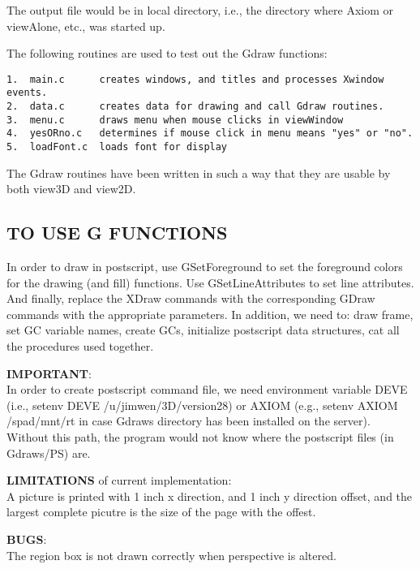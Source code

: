 \documentclass{article}
\begin{document}
The output file would be in local directory, i.e., the directory where Axiom
or viewAlone, etc., was started up.

The following routines are used to test out the Gdraw functions:
\begin{verbatim}
1.  main.c      creates windows, and titles and processes Xwindow events.
2.  data.c      creates data for drawing and call Gdraw routines.
3.  menu.c      draws menu when mouse clicks in viewWindow
4.  yesORno.c   determines if mouse click in menu means "yes" or "no".
5.  loadFont.c 	loads font for display
\end{verbatim}

The Gdraw routines have been written in such a way that they are usable by
both view3D and view2D.

\subsection{TO USE G FUNCTIONS}

In order to draw in postscript, use GSetForeground to set the foreground
colors for the drawing (and fill) functions.  Use GSetLineAttributes
to set line attributes.  And finally, replace the XDraw commands with the
corresponding GDraw commands with the appropriate parameters.  In addition,
we need to: draw frame, set GC variable names, create GCs, initialize
postscript data structures, cat all the procedures used together.

{\bf IMPORTANT}:\\
In order to create postscript command file, we need environment
variable DEVE (i.e., setenv DEVE /u/jimwen/3D/version28) or AXIOM (e.g., setenv
AXIOM /spad/mnt/rt in case Gdraws directory has been installed on the server).
Without this path, the program would not know where the postscript files (in
Gdraws/PS) are.

{\bf LIMITATIONS} of current implementation:\\
A picture is printed with 1 inch x direction, and 1 inch y direction
offset, and the largest complete picutre is the size of the page
with the offest.

{\bf BUGS}:\\
The region box is not drawn correctly when perspective is altered.
\end{document}
